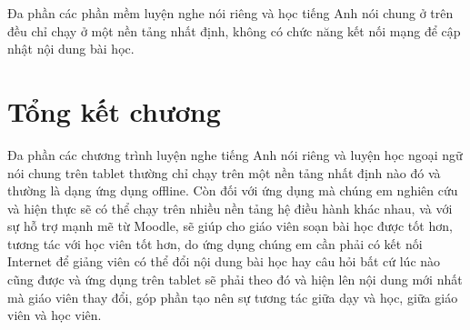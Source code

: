 Đa phần các phần mềm luyện nghe nói riêng và học tiếng Anh nói chung ở trên đều chỉ chạy ở một nền tảng nhất định, không có chức năng kết nối mạng để cập nhật nội dung bài học.

\section{Tổng kết chương}

Đa phần các chương trình luyện nghe tiếng Anh nói riêng và luyện học ngoại ngữ nói chung trên tablet thường chỉ chạy trên một nền tảng nhất định nào đó và thường là dạng ứng dụng offline. Còn đối với ứng dụng mà chúng em nghiên cứu và hiện thực sẽ có thể chạy trên nhiều nền tảng hệ điều hành khác nhau, và với sự hỗ trợ mạnh mẽ từ Moodle, sẽ giúp cho giáo viên soạn bài học được tốt hơn, tương tác với học viên tốt hơn, do ứng dụng chúng em cần phải có kết nối Internet để giảng viên có thể đổi nội dung bài học hay câu hỏi bất cứ lúc nào cũng được và ứng dụng trên tablet sẽ phải theo đó và hiện lên nội dung mới nhất mà giáo viên thay đổi, góp phần tạo nên sự tương tác giữa dạy và học, giữa giáo viên và học viên.